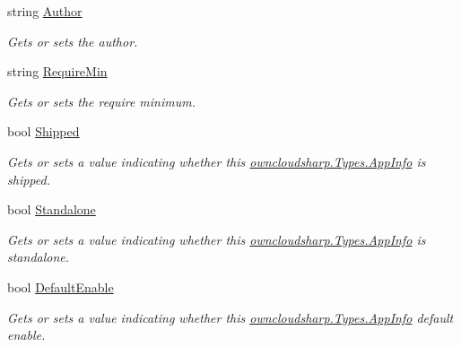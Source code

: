 \begin{DoxyCompactItemize}
string \hyperlink{classowncloudsharp_1_1_types_1_1_app_info_a479f84fd808ac1189895a7168d09aae2}{Author}
\begin{DoxyCompactList}\small\item\em Gets or sets the author. \end{DoxyCompactList}\item 
string \hyperlink{classowncloudsharp_1_1_types_1_1_app_info_a4c2f82a1c6fdb0dba49508f8e78b0e66}{Require\+Min}
\begin{DoxyCompactList}\small\item\em Gets or sets the require minimum. \end{DoxyCompactList}\item 
bool \hyperlink{classowncloudsharp_1_1_types_1_1_app_info_a8021265fafbd3d4b628a8f0cc517e50a}{Shipped}
\begin{DoxyCompactList}\small\item\em Gets or sets a value indicating whether this \hyperlink{classowncloudsharp_1_1_types_1_1_app_info}{owncloudsharp.\+Types.\+App\+Info} is shipped. \end{DoxyCompactList}\item 
bool \hyperlink{classowncloudsharp_1_1_types_1_1_app_info_a9094adc94004a3c884d0baede297ddef}{Standalone}
\begin{DoxyCompactList}\small\item\em Gets or sets a value indicating whether this \hyperlink{classowncloudsharp_1_1_types_1_1_app_info}{owncloudsharp.\+Types.\+App\+Info} is standalone. \end{DoxyCompactList}\item 
bool \hyperlink{classowncloudsharp_1_1_types_1_1_app_info_a21fbeb14bcd6b6783ef68231f9230f42}{Default\+Enable}
\begin{DoxyCompactList}\small\item\em Gets or sets a value indicating whether this \hyperlink{classowncloudsharp_1_1_types_1_1_app_info}{owncloudsharp.\+Types.\+App\+Info} default enable. \end{DoxyCompactList}\item 

\end{DoxyCompactItemize}
